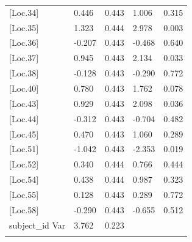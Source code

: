 \begin{longtable}{p{4cm}p{2cm}p{2cm}p{2cm}l}
	{[}Loc.34{]}    & 0.446  & 0.443 & 1.006  & 0.315 \\
	 \setrow{\bfseries} {[}Loc.35{]}    & \setrow{\bfseries}  1.323  & \setrow{\bfseries}  0.444 & \setrow{\bfseries}  2.978  & \setrow{\bfseries}  0.003   \\
	{[}Loc.36{]}    & -0.207 & 0.443 & -0.468 & 0.640   \\
	 \setrow{\bfseries} {[}Loc.37{]}    & \setrow{\bfseries}  0.945  & \setrow{\bfseries}  0.443 & \setrow{\bfseries}  2.134  & \setrow{\bfseries}  0.033   \\
	{[}Loc.38{]}    & -0.128 & 0.443 & -0.290 & 0.772 \\
	{[}Loc.40{]}    & 0.780  & 0.443 & 1.762  & 0.078 \\
	 \setrow{\bfseries} {[}Loc.43{]}    & \setrow{\bfseries}  0.929  & \setrow{\bfseries}  0.443 & \setrow{\bfseries}  2.098  & \setrow{\bfseries}  0.036   \\
	{[}Loc.44{]}    & -0.312 & 0.443 & -0.704 & 0.482 \\
	{[}Loc.45{]}    & 0.470  & 0.443 & 1.060  & 0.289 \\
	 \setrow{\bfseries} {[}Loc.51{]}    & \setrow{\bfseries} -1.042 & \setrow{\bfseries}  0.443 & \setrow{\bfseries}  -2.353 & \setrow{\bfseries}  0.019  \\
	{[}Loc.52{]}    & 0.340  & 0.444 & 0.766  & 0.444  \\
	{[}Loc.54{]}    & 0.438  & 0.444 & 0.987  & 0.323  \\
	{[}Loc.55{]}    & 0.128  & 0.443 & 0.289  & 0.772  \\
	{[}Loc.58{]}    & -0.290 & 0.443 & -0.655 & 0.512  \\
	subject\_id Var & 3.762  & 0.223 &  {}    &  {}    \\
	\hiderowcolors	\hline \hline
	\label{tab:RT_loc}
\end{longtable}


